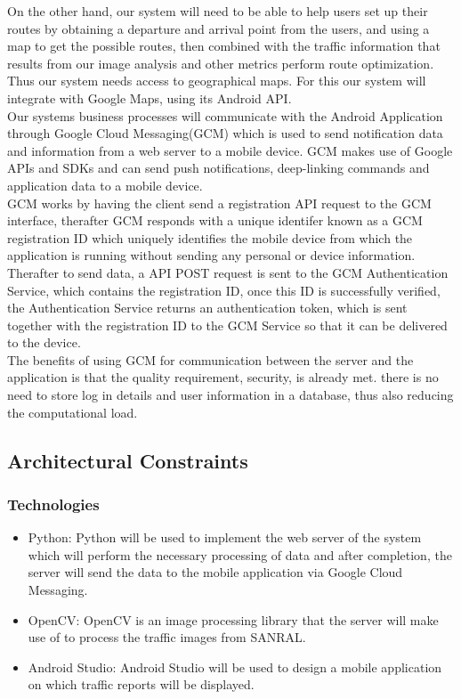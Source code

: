\documentclass[a4paper,12pt]{article}
\begin{document}
On the other hand, our system will need to be able to help users set up their routes by obtaining a departure and arrival point from the users, and using a map to get the possible routes, then combined with the traffic information that results from our image analysis and other metrics perform route optimization. Thus our system needs access to geographical maps. For this our system will integrate with Google Maps, using its Android API.\\

Our systems business processes will communicate with the Android Application through Google Cloud Messaging(GCM) which is used to send notification data and information from a web server to a mobile device. GCM makes use of Google APIs and SDKs and can send push notifications, deep-linking commands and application data to a mobile device. \\
GCM works by having the client send a registration API request to the GCM interface, therafter GCM responds with a unique identifer known as a GCM registration ID which uniquely identifies the mobile device from which the application is running without sending any personal or device information. Therafter to send data, a API POST request is sent to the GCM Authentication Service, which contains the registration ID, once this ID is successfully verified, the Authentication Service returns an authentication token, which is sent together with the registration ID to the GCM Service so that it can be delivered to the device. \\

The benefits of using GCM for communication between the server and the application is that the quality requirement, security, is already met. there is no need to store log in details and user information in a database, thus also reducing the computational load.

\subsection{Architectural Constraints}
\subsubsection{Technologies}
\begin{itemize}
\item Python: Python will be used to implement the web server of the system which will perform the necessary processing of data and after completion, the server will send the data to the mobile application via Google Cloud Messaging.
\item OpenCV: OpenCV is an image processing library that the server will make use of to process the traffic images from SANRAL.
\item Android Studio: Android Studio will be used to design a mobile application on which traffic reports will be displayed.
\end{itemize}
\end{document}
